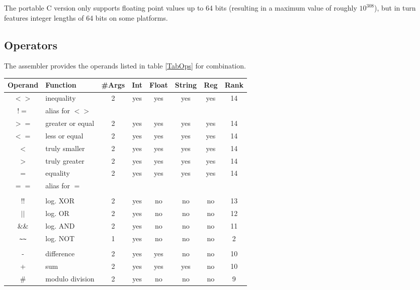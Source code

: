 \documentclass[12pt,twoside]{report}
\begin{document}
The portable C version  only supports floating
point values up to 64 bits (resulting in a maximum value of roughly
$10^{308}$), but in turn features integer lengths of 64 bits on some
platforms.

\subsection{Operators}

The assembler provides the operands listed in table \ref{TabOps} for
combination.
\begin{table*}[htbp]
\begin{center}\begin{tabular}{|c|l|c|c|c|c|c|c|}
\hline
Operand & Function            & \#Args & Int & Float & String & Reg & Rank \\
\hline
\hline
$<>$        & inequality       & 2 & yes   & yes & yes & yes & 14 \\
$!=$        & alias for $<>$   &   &       &     &     &     &    \\
$>=$        & greater or equal & 2 & yes   & yes & yes & yes & 14 \\
$<=$        & less or equal    & 2 & yes   & yes & yes & yes & 14 \\
$<$         & truly smaller    & 2 & yes   & yes & yes & yes & 14 \\
$>$         & truly greater    & 2 & yes   & yes & yes & yes & 14 \\
$=$         & equality         & 2 & yes   & yes & yes & yes & 14 \\
$==$        & alias for $=$    &   &       &     &     &     &    \\
            & & & & & &  \\
$!!$        & log. XOR         & 2 & yes   & no  & no  & no  & 13 \\
$||$        & log. OR          & 2 & yes   & no  & no  & no  & 12 \\
\&\&        & log. AND         & 2 & yes   & no  & no  & no  & 11 \\
\verb! ~~ ! & log. NOT         & 1 & yes   & no  & no  & no  & 2 \\
            & & & & & &  \\
-           & difference       & 2 & yes   & yes & no  & no  & 10 \\
+           & sum              & 2 & yes   & yes & yes & no  & 10 \\
\#          & modulo division  & 2 & yes   & no  & no  & no  & 9 \\

\end{tabular}
\end{center}
\end{table*}
\end{document}
